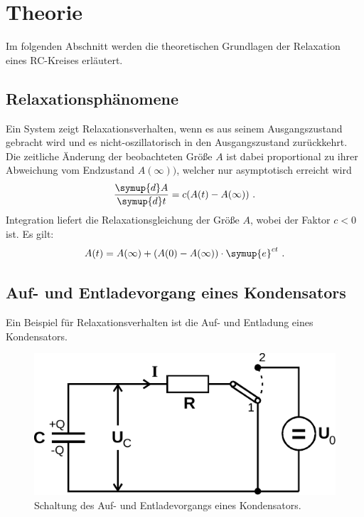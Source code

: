 \section{Theorie}
\label{sec:theorie}

    Im folgenden Abschnitt werden die theoretischen Grundlagen der Relaxation eines RC-Kreises erläutert.

\subsection{Relaxationsphänomene}

    Ein System zeigt Relaxationsverhalten,
    wenn es aus seinem Ausgangszustand gebracht wird und es nicht-oszillatorisch in den Ausgangszustand zurückkehrt.
    Die zeitliche Änderung der beobachteten Größe $A$ ist dabei proportional zu ihrer Abweichung vom Endzustand $A(\infty))$,
    welcher nur asymptotisch erreicht wird
    \begin{equation*}
        \frac{\symup{d}A}{\symup{d}t} = c(A(t) - A(\infty)) \ .
    \end{equation*}
    Integration liefert die Relaxationsgleichung der Größe $A$,
    wobei der Faktor $c < 0$ ist.
    Es gilt:
    \begin{equation*}
        A(t) = A(\infty) + (A(0) - A(\infty)) \cdot \symup{e}^{ct} \ .
    \end{equation*}

\subsection{Auf- und Entladevorgang eines Kondensators}

    Ein Beispiel für Relaxationsverhalten ist die Auf- und Entladung eines Kondensators.

    \begin{figure}
        \centering
        \includegraphics{content/img/Abb_1.pdf}
        \caption{Schaltung des Auf- und Entladevorgangs eines Kondensators. \cite{versuchsanleitung}}
        \label{fig:schaltung_kondensatorEntAufladung}
    \end{figure}

